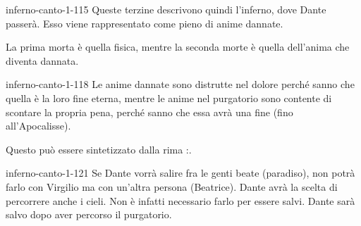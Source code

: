 \documentclass[preview]{standalone}
\begin{document}
\begin{snippet}{inferno-canto-1-115}
    Queste terzine descrivono quindi l'inferno, dove Dante passerà.
    Esso viene rappresentato come pieno di anime dannate.
    
    La prima morta è quella fisica, mentre la seconda morte è quella dell'anima che
    diventa dannata.
\end{snippet}

\begin{snippet}{inferno-canto-1-118}
    Le anime dannate sono distrutte nel dolore perché sanno che quella è la loro
    fine eterna, mentre le anime nel purgatorio sono contente di scontare la propria pena,
    perché sanno che essa avrà una fine (fino all'Apocalisse).

    Questo può essere sintetizzato dalla rima :.
\end{snippet}    

\begin{snippet}{inferno-canto-1-121}
    Se Dante vorrà salire fra le genti beate (paradiso), non potrà farlo con Virgilio
    ma con un'altra persona (Beatrice).
    Dante avrà la scelta di percorrere anche i cieli. Non è infatti necessario
    farlo per essere salvi. Dante sarà salvo dopo aver percorso il purgatorio.
\end{snippet}
\end{document}
